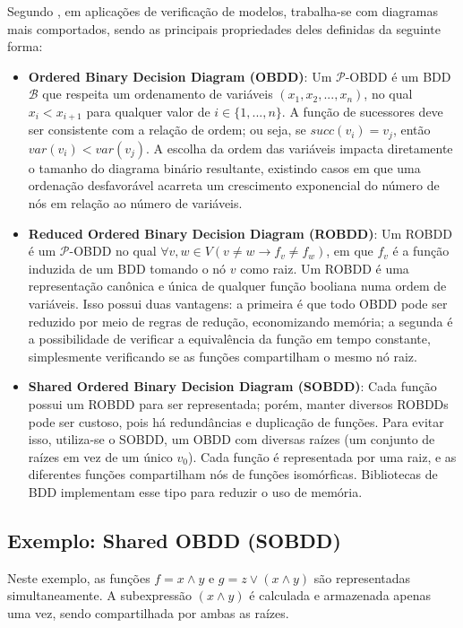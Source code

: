 \documentclass[cic,tc]{infufrgs}
\begin{document}
	Segundo , em aplicações de verificação de modelos, trabalha-se com diagramas mais comportados, sendo as principais propriedades deles definidas da seguinte forma:
	
	\begin{itemize}
		\item \textbf{Ordered Binary Decision Diagram (OBDD)}: Um $\mathcal{P}$-OBDD é um BDD $\mathcal{B}$ que respeita um ordenamento de variáveis $(x_1,x_2,...,x_n)$, no qual $x_i<x_{i+1}$ para qualquer valor de $i\in{\{1,...,n\}}$. A função de sucessores deve ser consistente com a relação de ordem; ou seja, se $succ(v_i) = v_j$, então $var(v_i)<var(v_j)$. A escolha da ordem das variáveis impacta diretamente o tamanho do diagrama binário resultante, existindo casos em que uma ordenação desfavorável acarreta um crescimento exponencial do número de nós em relação ao número de variáveis.
		\item \textbf{Reduced Ordered Binary Decision Diagram (ROBDD)}: Um ROBDD é um $\mathcal{P}$-OBDD no qual $\forall v,w\in V(v\neq w\to f_v \neq f_w)$, em que $f_v$ é a função induzida de um BDD tomando o nó $v$ como raiz. Um ROBDD é uma representação canônica e única de qualquer função booliana numa ordem de variáveis. Isso possui duas vantagens: a primeira é que todo OBDD pode ser reduzido por meio de regras de redução, economizando memória; a segunda é a possibilidade de verificar a equivalência da função em tempo constante, simplesmente verificando se as funções compartilham o mesmo nó raiz.
		\item \textbf{Shared Ordered Binary Decision Diagram (SOBDD)}: Cada função possui um ROBDD para ser representada; porém, manter diversos ROBDDs pode ser custoso, pois há redundâncias e duplicação de funções. Para evitar isso, utiliza-se o SOBDD, um OBDD com diversas raízes (um conjunto de raízes em vez de um único $v_0$). Cada função é representada por uma raiz, e as diferentes funções compartilham nós de funções isomórficas. Bibliotecas de BDD implementam esse tipo para reduzir o uso de memória.
	\end{itemize}  
	
	\subsection{Exemplo: Shared OBDD (SOBDD)}
	Neste exemplo, as funções $f = x \land y$ e $g = z \lor (x \land y)$ são representadas simultaneamente. A subexpressão $(x \land y)$ é calculada e armazenada apenas uma vez, sendo compartilhada por ambas as raízes.
	
\end{document}
